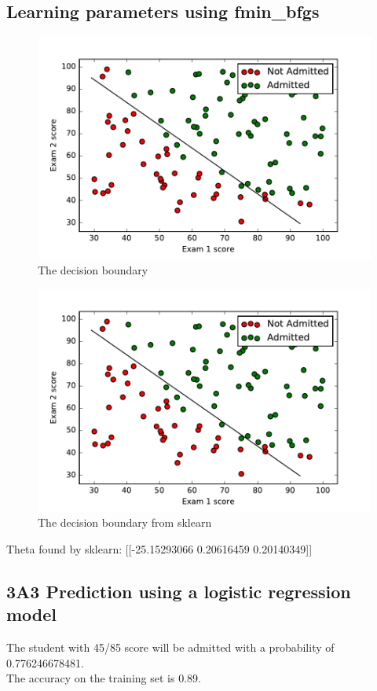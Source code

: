 \documentclass[pdftex,11pt]{article}
\begin{document}
\subsection{Learning parameters using fmin\_bfgs}
\begin{figure}[H]
  \caption{The decision boundary}
  \centering
    \includegraphics[scale=0.5]{fig2.pdf}
\end{figure}
\begin{figure}[H]
  \caption{The decision boundary from sklearn}
  \centering
    \includegraphics[scale=0.5]{fig2sk.pdf}
\end{figure}
Theta found by sklearn:  [[-25.15293066   0.20616459   0.20140349]]
\subsection{3A3 Prediction using a logistic regression model}
The student with 45/85 score will be admitted with a probability of 0.776246678481.\\
The accuracy on the training set is 0.89.\\
\end{document}
